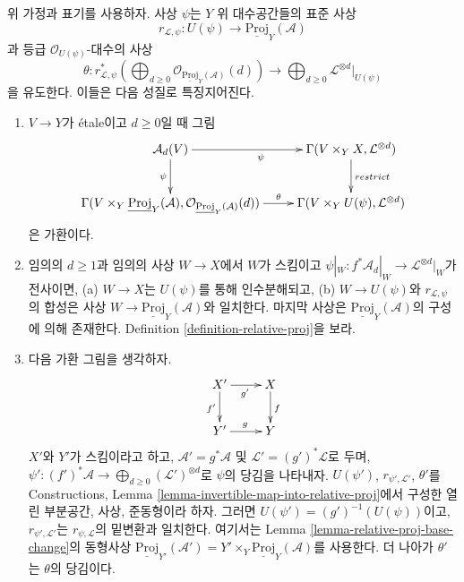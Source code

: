 \begin{lemma}
\label{lemma-invertible-map-into-relative-proj}
위 가정과 표기를 사용하자. 사상 $\psi$는 $Y$ 위 대수공간들의 표준 사상
$$
r_{\mathcal{L}, \psi} :
U(\psi) \longrightarrow \underline{\text{Proj}}_Y(\mathcal{A})
$$
과 등급 $\mathcal{O}_{U(\psi)}$-대수의 사상
$$
\theta :
r_{\mathcal{L}, \psi}^*\left(
\bigoplus\nolimits_{d \geq 0}
\mathcal{O}_{\underline{\text{Proj}}_Y(\mathcal{A})}(d)
\right)
\longrightarrow
\bigoplus\nolimits_{d \geq 0} \mathcal{L}^{\otimes d}|_{U(\psi)}
$$
을 유도한다. 이들은 다음 성질로 특징지어진다.
\begin{enumerate}
\item $V \to Y$가 \'etale이고 $d \geq 0$일 때 그림
$$
\xymatrix{
\mathcal{A}_d(V) \ar[d]_{\psi} \ar[r]_{\psi} &
\Gamma(V \times_Y X, \mathcal{L}^{\otimes d}) \ar[d]^{restrict} \\
\Gamma(V \times_Y \underline{\text{Proj}}_Y(\mathcal{A}),
\mathcal{O}_{\underline{\text{Proj}}_Y(\mathcal{A})}(d)) \ar[r]^-\theta &
\Gamma(V \times_Y U(\psi), \mathcal{L}^{\otimes d})
}
$$
은 가환이다.
\item 임의의 $d \geq 1$과 임의의 사상 $W \to X$에서 $W$가 스킴이고
$\psi|_W : f^*\mathcal{A}_d|_W \to \mathcal{L}^{\otimes d}|_W$가
전사이면, (a) $W \to X$는 $U(\psi)$를 통해 인수분해되고,
(b) $W \to U(\psi)$와 $r_{\mathcal{L}, \psi}$의 합성은 사상
$W \to \underline{\text{Proj}}_Y(\mathcal{A})$와 일치한다. 마지막 사상은
$\underline{\text{Proj}}_Y(\mathcal{A})$의 구성에 의해 존재한다.
Definition \ref{definition-relative-proj}을 보라.
\item 다음 가환 그림을 생각하자.
$$
\xymatrix{
X' \ar[r]_{g'} \ar[d]_{f'} & X \ar[d]^f \\
Y' \ar[r]^g & Y
}
$$
$X'$와 $Y'$가 스킴이라고 하고, $\mathcal{A}' = g^*\mathcal{A}$ 및
$\mathcal{L}' = (g')^*\mathcal{L}$로 두며,
$\psi' : (f')^*\mathcal{A} \to \bigoplus_{d \geq 0} (\mathcal{L}')^{\otimes d}$로
$\psi$의 당김을 나타내자.
$U(\psi')$, $r_{\psi', \mathcal{L}'}$, $\theta'$를
Constructions, Lemma \ref{lemma-invertible-map-into-relative-proj}에서
구성한 열린 부분공간, 사상, 준동형이라 하자. 그러면
$U(\psi') = (g')^{-1}(U(\psi))$이고, $r_{\psi', \mathcal{L}'}$는
$r_{\psi, \mathcal{L}}$의 밑변환과 일치한다. 여기서는 Lemma
\ref{lemma-relative-proj-base-change}의 동형사상
$\underline{\text{Proj}}_{Y'}(\mathcal{A}') =
Y' \times_Y \underline{\text{Proj}}_Y(\mathcal{A})$를 사용한다.
더 나아가 $\theta'$는 $\theta$의 당김이다.
\end{enumerate}
\end{lemma}


